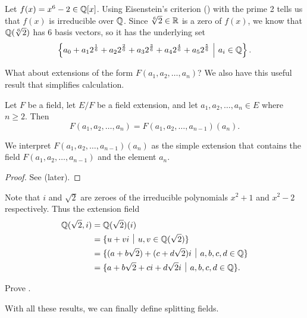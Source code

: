 \begin{example}
    Let $f(x) = x^6 - 2 \in \mathbb{Q}[x]$. Using Eisenstein's criterion () with the prime 2 tells us that $f(x)$ is irreducible over $\mathbb{Q}$. Since $\sqrt[6]2 \in \mathbb{R}$ is a zero of $f(x)$, we know that $\mathbb{Q}(\sqrt[6]2)$ has 6 basis vectors, so it has the underlying set
    \[
        \left\{a_0 + a_12^{\frac16} + a_22^{\frac26} + a_32^{\frac36} + a_42^{\frac46} + a_52^{\frac56} \vert a_i \in \Q\right\}.
    \]
\end{example}

What about extensions of the form $F(a_1, a_2, \dots, a_n)$? We also have this useful result that simplifies calculation.
\begin{proposition}\label{prop-field-generated-by-S-inductive-definition}
    Let $F$ be a field, let $E/F$ be a field extension, and let $a_1, a_2, \dots, a_n \in E$ where $n \geq 2$. Then
    \[
        F(a_1, a_2, \dots, a_n) = F(a_1, a_2, \dots, a_{n-1})(a_n).
    \]
\end{proposition}
\begin{remark}
    We interpret $F(a_1, a_2, \dots, a_{n-1})(a_n)$ as the simple extension that contains the field $F(a_1, a_2, \dots, a_{n-1})$ and the element $a_n$.
\end{remark}
\begin{proof}
    See  (later).
\end{proof}

\begin{example}
    Note that $i$ and $\sqrt 2$ are zeroes of the irreducible polynomials $x^2 + 1$ and $x^2 - 2$ respectively. Thus the extension field
    \begin{align*}
        \Q(\sqrt 2, i) &= \Q(\sqrt 2)(i)\\
        &= \{u + vi \vert u,v \in \Q(\sqrt2)\}\\
        &= \{(a+b\sqrt2) + (c+d\sqrt2)i \vert a, b, c, d \in \Q\}\\
        &= \{a + b\sqrt2 + ci + d\sqrt2i \vert a, b, c, d \in \Q\}.
    \end{align*}
\end{example}

\begin{exercise}\label{exercise-field-generated-by-S-inductive-definition}
    Prove .
\end{exercise}

With all these results, we can finally define splitting fields.


